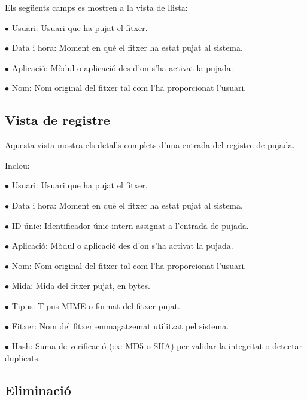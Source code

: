 \documentclass[a4paper]{article}
\begin{document}
Els següents camps es mostren a la vista de llista:

\begin{compactitem}
\item[\color{myblue}$\bullet$] Usuari: Usuari que ha pujat el fitxer.
\item[\color{myblue}$\bullet$] Data i hora: Moment en què el fitxer ha estat pujat al sistema.
\item[\color{myblue}$\bullet$] Aplicació: Mòdul o aplicació des d'on s'ha activat la pujada.
\item[\color{myblue}$\bullet$] Nom: Nom original del fitxer tal com l'ha proporcionat l'usuari.
\end{compactitem}

\hypertarget{toc39}{}
\subsection{Vista de registre}

Aquesta vista mostra els detalls complets d'una entrada del registre de pujada.

Inclou:

\begin{compactitem}
\item[\color{myblue}$\bullet$] Usuari: Usuari que ha pujat el fitxer.
\item[\color{myblue}$\bullet$] Data i hora: Moment en què el fitxer ha estat pujat al sistema.
\item[\color{myblue}$\bullet$] ID únic: Identificador únic intern assignat a l'entrada de pujada.
\item[\color{myblue}$\bullet$] Aplicació: Mòdul o aplicació des d'on s'ha activat la pujada.
\item[\color{myblue}$\bullet$] Nom: Nom original del fitxer tal com l'ha proporcionat l'usuari.
\item[\color{myblue}$\bullet$] Mida: Mida del fitxer pujat, en bytes.
\item[\color{myblue}$\bullet$] Tipus: Tipus MIME o format del fitxer pujat.
\item[\color{myblue}$\bullet$] Fitxer: Nom del fitxer emmagatzemat utilitzat pel sistema.
\item[\color{myblue}$\bullet$] Hash: Suma de verificació (ex: MD5 o SHA) per validar la integritat o detectar duplicats.
\end{compactitem}

\hypertarget{toc40}{}
\subsection{Eliminació}
\end{document}
